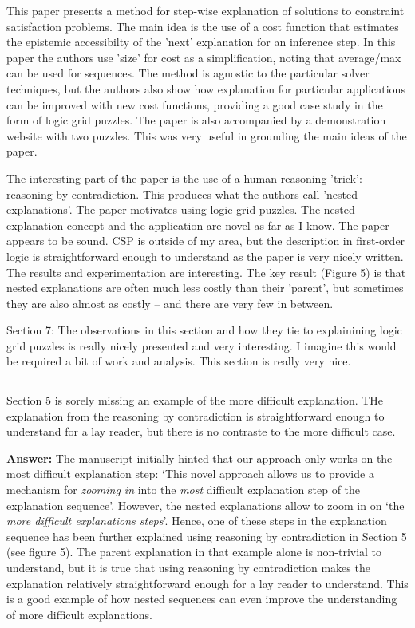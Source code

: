 \documentclass{article}
\newcommand\comment[1]{\marginpar{\tiny #1}}
\renewcommand\comment[1]{#1}
\newcommand{\answer}[1]{{\comment{\textbf{Answer:} #1}}}
\begin{document}
\begin{quoteit}
	This paper presents a method for step-wise explanation of solutions to
	constraint satisfaction problems. The main idea is the use of a cost
	function that estimates the epistemic accessibilty of the 'next'
	explanation for an inference step. In this paper the authors use 'size'
	for cost as a simplification, noting that average/max can be used for
	sequences.  The method is agnostic to the particular solver techniques,
	but the authors also show how explanation for particular applications
	can be improved with new cost functions, providing a good case study in
	the form of logic grid puzzles. The paper is also accompanied by a
	demonstration website with two puzzles. This was very useful in
	grounding the main ideas of the paper.
	
	The interesting part of the paper is the use of a human-reasoning
	'trick': reasoning by contradiction. This produces what the authors
	call 'nested explanations'. The paper motivates using logic grid
	puzzles. The nested explanation concept and the application are novel
	as far as I know. The paper appears to be sound. CSP is outside of my
	area, but the description in first-order logic is straightforward
	enough to understand as the paper is very nicely written. The results
	and experimentation are interesting. The key result (Figure 5) is that
	nested explanations are often much less costly than their 'parent', but
	sometimes they are also almost as costly -- and there are very few in
	between.
	
	
	Section 7: The observations in this section and how they tie to
	explainining logic grid puzzles is really nicely presented and very
	interesting. I imagine this would be required a bit of work and
	analysis. This section is really very nice.
	
	\rule{0.9\textwidth}{0.4pt}
	
Section 5 is sorely missing an example of the more difficult explanation. THe explanation from the reasoning by contradiction is straightforward enough to understand for a lay reader, but there is no contraste to the more difficult case.
\end{quoteit}

\answer{The manuscript initially hinted that our approach only works on the most difficult explanation step: `This novel approach allows us to provide a mechanism for \emph{zooming in} into the \emph{most} difficult explanation step of the explanation sequence'. However, the nested explanations allow to zoom in on `the \emph{more difficult explanations steps}'. Hence, one of these steps in the explanation sequence has been further explained using reasoning by contradiction in Section 5 (see figure 5). 
	The parent explanation in that example alone is non-trivial to understand, but it is true that using reasoning by contradiction makes the explanation relatively straightforward enough for a lay reader to understand. This is a good example of how nested sequences can even improve the understanding of more difficult explanations.}
\end{document}
